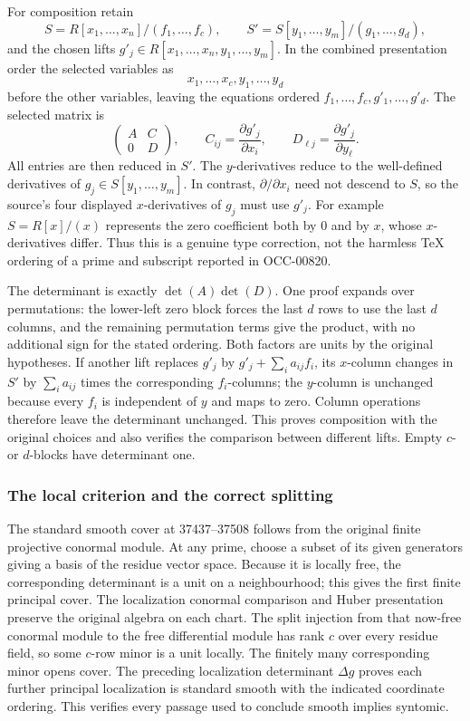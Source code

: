 For composition retain \[
S=R[x_1,\ldots,x_n]/(f_1,\ldots,f_c),\qquad
S'=S[y_1,\ldots,y_m]/(g_1,\ldots,g_d),
\] and the chosen lifts \(g'_j\in R[x_1,\ldots,x_n,y_1,\ldots,y_m]\). In the combined presentation order the selected variables as \[
x_1,\ldots,x_c,y_1,\ldots,y_d
\] before the other variables, leaving the equations ordered \(f_1,\ldots,f_c,g'_1,\ldots,g'_d\). The selected matrix is \[
\begin{pmatrix}
A&C\\0&D
\end{pmatrix},
\qquad
C_{ij}=\frac{\partial g'_j}{\partial x_i},\qquad
D_{\ell j}=\frac{\partial g'_j}{\partial y_\ell}.
\] All entries are then reduced in \(S'\). The \(y\)-derivatives reduce to the well-defined derivatives of \(g_j\in S[y_1,\ldots,y_m]\). In contrast, \(\partial/\partial x_i\) need not descend to \(S\), so the source's four displayed \(x\)-derivatives of \(g_j\) must use \(g'_j\). For example \(S=R[x]/(x)\) represents the zero coefficient both by \(0\) and by \(x\), whose \(x\)-derivatives differ. Thus this is a genuine type correction, not the harmless TeX ordering of a prime and subscript reported in OCC-00820.

The determinant is exactly \(\det(A)\det(D)\). One proof expands over permutations: the lower-left zero block forces the last \(d\) rows to use the last \(d\) columns, and the remaining permutation terms give the product, with no additional sign for the stated ordering. Both factors are units by the original hypotheses. If another lift replaces \(g'_j\) by \(g'_j+\sum_i a_{ij}f_i\), its \(x\)-column changes in \(S'\) by \(\sum_i a_{ij}\) times the corresponding \(f_i\)-columns; the \(y\)-column is unchanged because every \(f_i\) is independent of \(y\) and maps to zero. Column operations therefore leave the determinant unchanged. This proves composition with the original choices and also verifies the comparison between different lifts. Empty \(c\)- or \(d\)-blocks have determinant one.

\subsubsection{The local criterion and the correct splitting}\label{the-local-criterion-and-the-correct-splitting}

The standard smooth cover at 37437--37508 follows from the original finite projective conormal module. At any prime, choose a subset of its given generators giving a basis of the residue vector space. Because it is locally free, the corresponding determinant is a unit on a neighbourhood; this gives the first finite principal cover. The localization conormal comparison and Huber presentation preserve the original algebra on each chart. The split injection from that now-free conormal module to the free differential module has rank \(c\) over every residue field, so some \(c\)-row minor is a unit locally. The finitely many corresponding minor opens cover. The preceding localization determinant \(\Delta g\) proves each further principal localization is standard smooth with the indicated coordinate ordering. This verifies every passage used to conclude smooth implies syntomic.

